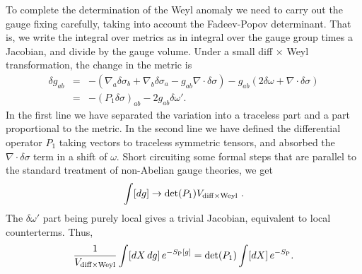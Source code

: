 To complete the determination of the Weyl anomaly we need to
carry out the gauge fixing carefully, taking into account the
Fadeev-Popov determinant.  That is, we write the integral over
metrics as in integral over the gauge group times a Jacobian,
and divide by the gauge volume.  Under a small diff $\times$
Weyl transformation, the change in the metric is
\begin{eqnarray}
\delta g_{ab} &=& - (\nabla_a \delta \sigma_b 
+ \nabla_b \delta \sigma_a - g_{ab} \nabla \cdot \delta \sigma)
- g_{ab} (2\delta\omega + \nabla \cdot \delta \sigma)
\nonumber\\
&=& -(P_1 \delta \sigma)_{ab} - 2g_{ab} \delta\omega'.
\end{eqnarray}
In the first line we have separated the variation into
a traceless part and a part proportional to the metric.
In the second line we have defined the differential operator
$P_1$ taking vectors to traceless symmetric tensors, and
absorbed the $\nabla \cdot \delta \sigma$ term in a shift of
$\omega$.  Short circuiting some formal steps that are
parallel to the standard treatment of non-Abelian gauge
theories, we get
\begin{equation}
\int [dg] \to \det(P_1) V_{\rm diff \times Weyl}\ .
\end{equation}
The $\delta\omega'$ part being purely local gives a trivial
Jacobian, equivalent to local counterterms.  Thus,
\begin{equation}
\frac{1}{V_{\rm diff \times Weyl}} \int [dX\,dg]\, e^{-S_{\rm
P}[g]} = \det(P_1) \int [dX]\, e^{-S_{\rm P}} . \label{gafix}
\end{equation}

